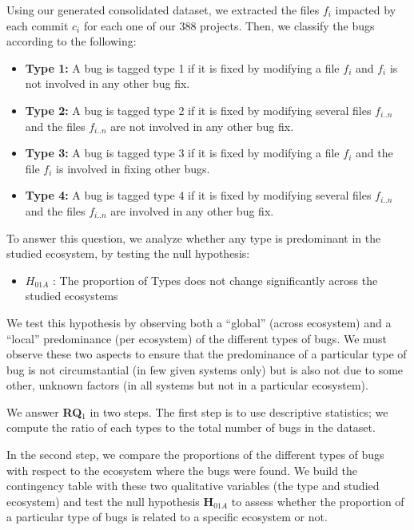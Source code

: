 Using our generated consolidated dataset, we extracted the files $f_i$ impacted by each commit $c_i$ for each one of our 388 projects.
Then, we classify the bugs according to the following:

\begin{itemize}
  \item {\bf Type 1:} A bug is tagged type 1 if it is fixed by modifying a file $f_i$ and $f_i$ is not involved in any other bug fix.
  \item {\bf Type 2:} A bug is tagged type 2 if it is fixed by modifying several files $f_{i..n}$ and the files $f_{i..n}$ are not involved in any other bug fix.
  \item {\bf Type 3:} A bug is tagged type 3 if it is fixed by modifying a file $f_{i}$ and the file $f_{i}$ is involved in fixing other bugs.
  \item {\bf Type 4:} A bug is tagged type 4 if it is fixed by modifying several files $f_{i..n}$ and the files $f_{i..n}$ are involved in any other bug fix.
\end{itemize}

To answer this question, we analyze whether any type is predominant in the studied ecosystem, by testing the null hypothesis:

\begin{itemize}
	\item $H_{01A}$ : The proportion of Types does not
change significantly across the studied ecosystems
\end{itemize}

We test this hypothesis by observing both a ``global'' (across ecosystem) and a ``local'' predominance (per ecosystem) of the different types of bugs.
We must observe these two aspects to ensure that the predominance of a particular type of bug is not circumstantial (in few given systems only) but is also not due to some other, unknown factors (in all systems but not in a particular ecosystem).

We answer {\bf RQ$_1$} in two steps.
The first step is to use descriptive statistics; we compute the ratio of each types to the total number of bugs in the dataset.

In the second step, we compare the proportions of the different types of bugs with respect to the ecosystem where the bugs were found.
We build the contingency table with these two qualitative variables (the type and studied ecosystem) and test the null hypothesis {\bf H$_{01A}$} to assess whether the proportion of a particular type of bugs is related to a specific ecosystem or not.

